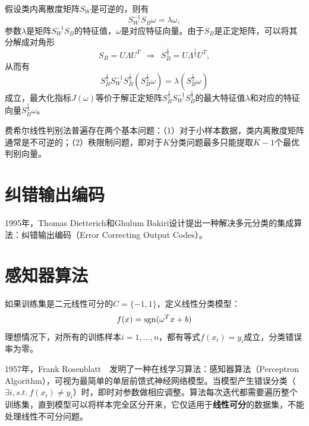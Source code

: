 假设类内离散度矩阵$S_W$是可逆的，则有
\[
    S_W^{-1} S_B \omega = \lambda \omega,
\]
参数$\lambda$是矩阵$S_W^{-1} S_B$的特征值，$\omega$是对应特征向量。由于$S_B$是正定矩阵，可以将其分解成对角形
\[
    S_B = U\Lambda U^T~~\Rightarrow ~~S_B^\frac{1}{2} = U\Lambda^\frac{1}{2} U^T,
\]
从而有
\[
    S_B^\frac{1}{2} S_W^{-1} S_B^\frac{1}{2} (S_B^\frac{1}{2} \omega) = \lambda (S_B^\frac{1}{2} \omega)
\]
成立，最大化指标$J(\omega)$等价于解正定矩阵$S_B^\frac{1}{2} S_W^{-1} S_B^\frac{1}{2}$的最大特征值$\lambda$和对应的特征向量$S_B^\frac{1}{2} \omega$。

费希尔线性判别法普遍存在两个基本问题：（1）对于小样本数据，类内离散度矩阵通常是不可逆的；（2）秩限制问题，即对于$K$分类问题最多只能提取$K-1$个最优判别向量。

\section{纠错输出编码}
1995年，Thomas Dietterich和Ghulum Bakiri设计提出一种解决多元分类的集成算法：纠错输出编码（Error Correcting Output Codes）。

\section{感知器算法}
如果训练集是二元线性可分的$C = \{-1,1\}$，定义线性分类模型：
\begin{equation}
    f(x) = \operatorname{\mathrm{sgn}}(\omega^T x + b)
\end{equation}
理想情况下，对所有的训练样本$i = 1,\ldots,n$，都有等式$f(x_i) = y_i$成立，分类错误率为零。

1957年，Frank Rosenblatt~\cite{rosenblatt1957perceptron}~发明了一种在线学习算法：感知器算法（Perceptron Algorithm），可视为最简单的单层前馈式神经网络模型。当模型产生错误分类（$\exists i, s.t.~f(x_i)\ne y_i$）时，即时对参数做相应调整。算法每次迭代都需要遍历整个训练集，直到模型可以将样本完全区分开来，它仅适用于\textbf{线性可分}的数据集，不能处理线性不可分问题。

